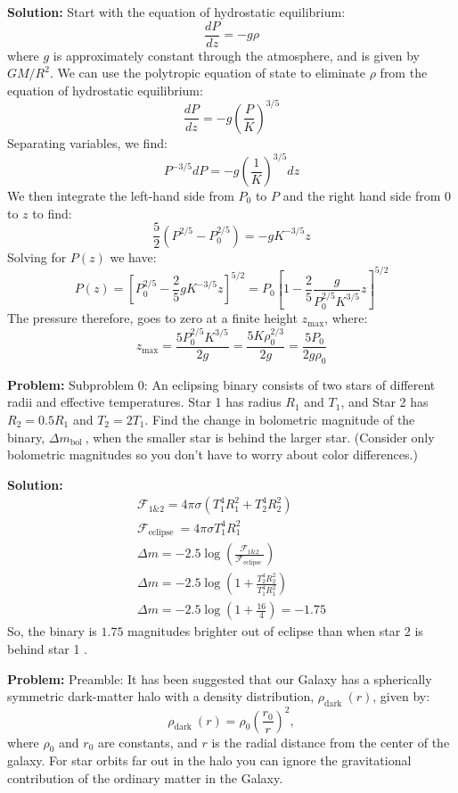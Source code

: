 \documentclass[10pt]{article}
\begin{document}
\textbf{Solution:}
Start with the equation of hydrostatic equilibrium:
\[
\frac{d P}{d z}=-g \rho
\]
where $g$ is approximately constant through the atmosphere, and is given by $G M / R^{2}$. We can use the polytropic equation of state to eliminate $\rho$ from the equation of hydrostatic equilibrium:
\[
\frac{d P}{d z}=-g\left(\frac{P}{K}\right)^{3 / 5}
\]
Separating variables, we find:
\[
P^{-3 / 5} d P=-g\left(\frac{1}{K}\right)^{3 / 5} d z
\]
We then integrate the left-hand side from $P_{0}$ to $P$ and the right hand side from 0 to $z$ to find:
\[
\frac{5}{2}\left(P^{2 / 5}-P_{0}^{2 / 5}\right)=-g K^{-3 / 5} z
\]
Solving for $P(z)$ we have:
\[
  P(z)=\boxed{\left[P_{0}^{2 / 5}-\frac{2}{5} g K^{-3 / 5} z\right]^{5 / 2}}=P_{0}\left[1-\frac{2}{5} \frac{g}{P_{0}^{2 / 5} K^{3 / 5}} z\right]^{5 / 2}
\]
The pressure therefore, goes to zero at a finite height $z_{\max }$, where:
\[
z_{\max }=\frac{5 P_{0}^{2 / 5} K^{3 / 5}}{2 g}=\frac{5 K \rho_{0}^{2 / 3}}{2 g}=\frac{5 P_{0}}{2 g \rho_{0}}
\]


\textbf{Problem:}
Subproblem 0: An eclipsing binary consists of two stars of different radii and effective temperatures. Star 1 has radius $R_{1}$ and $T_{1}$, and Star 2 has $R_{2}=0.5 R_{1}$ and $T_{2}=2 T_{1}$. Find the change in bolometric magnitude of the binary, $\Delta m_{\text {bol }}$, when the smaller star is behind the larger star. (Consider only bolometric magnitudes so you don't have to worry about color differences.)


\textbf{Solution:}
\[
\begin{gathered}
\mathcal{F}_{1 \& 2}=4 \pi \sigma\left(T_{1}^{4} R_{1}^{2}+T_{2}^{4} R_{2}^{2}\right) \\
\mathcal{F}_{\text {eclipse }}=4 \pi \sigma T_{1}^{4} R_{1}^{2} \\
\Delta m=-2.5 \log \left(\frac{\mathcal{F}_{1 \& 2}}{\mathcal{F}_{\text {eclipse }}}\right) \\
\Delta m=-2.5 \log \left(1+\frac{T_{2}^{4} R_{2}^{2}}{T_{1}^{4} R_{1}^{2}}\right) \\
\Delta m=-2.5 \log \left(1+\frac{16}{4}\right)=-1.75
\end{gathered}
\]
So, the binary is $\boxed{1.75}$ magnitudes brighter out of eclipse than when star 2 is behind star 1 .


\textbf{Problem:}
Preamble: It has been suggested that our Galaxy has a spherically symmetric dark-matter halo with a density distribution, $\rho_{\text {dark }}(r)$, given by:
\[
\rho_{\text {dark }}(r)=\rho_{0}\left(\frac{r_{0}}{r}\right)^{2},
\]
where $\rho_{0}$ and $r_{0}$ are constants, and $r$ is the radial distance from the center of the galaxy. For star orbits far out in the halo you can ignore the gravitational contribution of the ordinary matter in the Galaxy.
\end{document}

